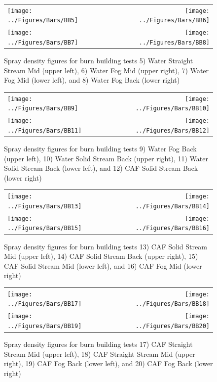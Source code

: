 \documentclass[12pt,oneside]{book}
\begin{document}
\clearpage

\begin{figure}[ht]
\begin{tabular*}{\textwidth}{lr}
\texttt{[image: ../Figures/Bars/BB5]} &
\texttt{[image: ../Figures/Bars/BB6]} \\
\texttt{[image: ../Figures/Bars/BB7]} &
\texttt{[image: ../Figures/Bars/BB8]}
\end{tabular*}
\caption{Spray density figures for burn building tests 5) Water Straight Stream Mid (upper left), 6) Water Fog Mid (upper right), 7) Water Fog Mid (lower left), and 8) Water Fog Back (lower right)}
\label{fig:bb_5_8}
\end{figure}

\clearpage

\begin{figure}[ht]
\begin{tabular*}{\textwidth}{lr}
\texttt{[image: ../Figures/Bars/BB9]} &
\texttt{[image: ../Figures/Bars/BB10]} \\
\texttt{[image: ../Figures/Bars/BB11]} &
\texttt{[image: ../Figures/Bars/BB12]}
\end{tabular*}
\caption{Spray density figures for burn building tests 9) Water Fog Back (upper left), 10) Water Solid Stream Back (upper right), 11) Water Solid Stream Back (lower left), and 12) CAF Solid Stream Back (lower right)}
\label{fig:bb_9_12}
\end{figure}

\clearpage

\begin{figure}[ht]
\begin{tabular*}{\textwidth}{lr}
\texttt{[image: ../Figures/Bars/BB13]} &
\texttt{[image: ../Figures/Bars/BB14]} \\
\texttt{[image: ../Figures/Bars/BB15]} &
\texttt{[image: ../Figures/Bars/BB16]}
\end{tabular*}
\caption{Spray density figures for burn building tests 13) CAF Solid Stream Mid (upper left), 14) CAF Solid Stream Back (upper right), 15) CAF Solid Stream Mid (lower left), and 16) CAF Fog Mid (lower right)}
\label{fig:bb_13_16}
\end{figure}

\clearpage

\begin{figure}[ht]
\begin{tabular*}{\textwidth}{lr}
\texttt{[image: ../Figures/Bars/BB17]} &
\texttt{[image: ../Figures/Bars/BB18]} \\
\texttt{[image: ../Figures/Bars/BB19]} &
\texttt{[image: ../Figures/Bars/BB20]}
\end{tabular*}
\caption{Spray density figures for burn building tests 17) CAF Straight Stream Mid (upper left), 18) CAF Straight Stream Mid (upper right), 19) CAF Fog Back (lower left), and 20) CAF Fog Back (lower right)}
\label{fig:bb_19_21}
\end{figure}
\end{document}
